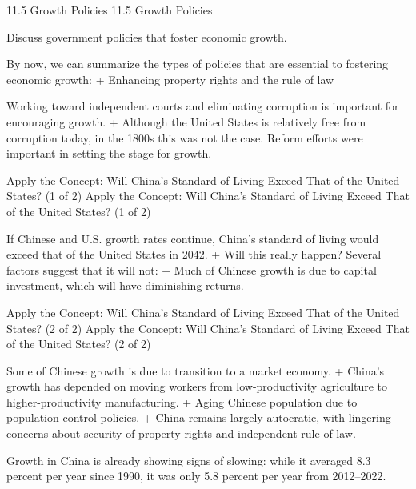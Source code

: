 \documentclass[
  12pt,
  ignorenonframetext,
]{beamer}
\begin{document}
\begin{frame}{11.5 Growth Policies}
\protect\hypertarget{growth-policies}{}
11.5 Growth Policies

Discuss government policies that foster economic growth.

By now, we can summarize the types of policies that are essential to
fostering economic growth: + Enhancing property rights and the rule of
law

Working toward independent courts and eliminating corruption is
important for encouraging growth. + Although the United States is
relatively free from corruption today, in the 1800s this was not the
case. Reform efforts were important in setting the stage for growth.
\end{frame}

\begin{frame}{Apply the Concept: Will China's Standard of Living Exceed
That of the United States? (1 of 2)}
\protect\hypertarget{apply-the-concept-will-chinas-standard-of-living-exceed-that-of-the-united-states-1-of-2}{}
Apply the Concept: Will China's Standard of Living Exceed That of the
United States? (1 of 2)

If Chinese and U.S. growth rates continue, China's standard of living
would exceed that of the United States in 2042. + Will this really
happen? Several factors suggest that it will not: + Much of Chinese
growth is due to capital investment, which will have diminishing
returns.
\end{frame}

\begin{frame}{Apply the Concept: Will China's Standard of Living Exceed
That of the United States? (2 of 2)}
\protect\hypertarget{apply-the-concept-will-chinas-standard-of-living-exceed-that-of-the-united-states-2-of-2}{}
Apply the Concept: Will China's Standard of Living Exceed That of the
United States? (2 of 2)

Some of Chinese growth is due to transition to a market economy. +
China's growth has depended on moving workers from low-productivity
agriculture to higher-productivity manufacturing. + Aging Chinese
population due to population control policies. + China remains largely
autocratic, with lingering concerns about security of property rights
and independent rule of law.

Growth in China is already showing signs of slowing: while it averaged
8.3 percent per year since 1990, it was only 5.8 percent per year from
2012--2022.
\end{frame}
\end{document}
